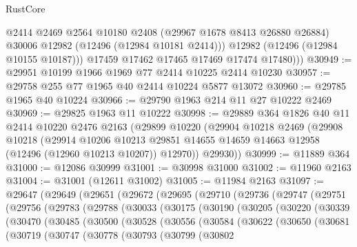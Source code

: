 \begin{lexlean}{RustCore}
\begin{coremodule}
              @2414
              @2469
              @2564
              @10180
              @2408
              (@29967 @1678 @8413 @26880 @26884)
              @30006
              @12982
              (@12496 (@12984 @10181 @2414)))
            @12982
            (@12496 (@12984 @10155 @10187)))
          @17459
          @17462
          @17465
          @17469
          @17474
          @17480)))
@30949 := @29951 @10199 @1966 @1969 @77 @2414 @10225 @2414 @10230
@30957 := @29758 @255 @77 @1965 @40 @2414 @10224 @5877 @13072
@30960 := @29785 @1965 @40 @10224
@30966 := @29790 @1963 @214 @11 @27 @10222 @2469
@30969 := @29825 @1963 @11 @10222
@30998 := @29889
    @364
    @1826
    @40
    @11
    @2414
    @10220
    @2476
    @2163
    (@29899
      @10220
      (@29904
        @10218
        @2469
        (@29908
          @10218
          (@29914
            @10206
            @10213
            @29851
            @14655
            @14659
            @14663
            @12958
            (@12496 (@12960 @10213 @10207))
            @12970))
        @29930))
@30999 := @11889 @364
@31000 := @12086 @30999
@31001 := @30998 @31000
@31002 := @11960 @2163
@31004 := @31001 (@12611 @31002)
@31005 := @11984 @2163
@31097 := @29647
    (@29649
      (@29651
        (@29672
          (@29695
            (@29710
              (@29736
                (@29747
                  (@29751
                    (@29756
                      (@29783
                        (@29788
                          (@30033
                            (@30175
                              (@30190
                                (@30205
                                  (@30220
                                    (@30339
                                      (@30470
                                        (@30485
                                          (@30500
                                            (@30528
                                              (@30556
                                                (@30584
                                                  (@30622
                                                    (@30650
                                                      (@30681
                                                        (@30719
                                                          (@30747
                                                            (@30778
                                                              (@30793
                                                                (@30799
                                                                  (@30802

\end{coremodule}
\end{lexlean}
